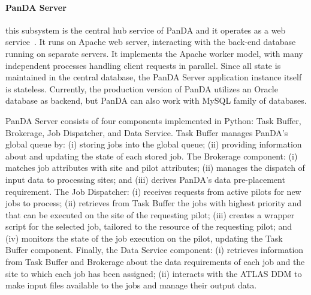 \paragraph{\textbf{PanDA Server}} this subsystem is the central hub service of
PanDA and it operates as a web service~\cite{maeno2011overview}. It runs on
Apache web server, interacting with the back-end database running on separate
servers. It implements the Apache worker model, with many independent processes
handling client requests in parallel. Since all state is maintained in the
central database, the PanDA Server application instance itself is stateless.
Currently, the production version of PanDA utilizes an Oracle database as
backend, but PanDA can also work with MySQL family of databases.


PanDA Server consists of four components implemented in Python:
Task Buffer, Brokerage, Job Dispatcher, and Data Service. Task Buffer manages
PanDA's global queue by: (i) storing jobs into the global queue; (ii) providing
information about and updating the state of each stored job. The Brokerage
component: (i) matches job attributes with site and pilot attributes; (ii)
manages the dispatch of input data to processing sites; and (iii) derives
PanDA's data pre-placement requirement. The Job Dispatcher: (i) receives
requests from active pilots for new jobs to process; (ii) retrieves from Task
Buffer the jobs with highest priority and that can be executed on the site of
the requesting pilot; (iii) creates a wrapper script for the selected job,
tailored to the resource of the requesting pilot; and (iv) monitors the state of
the job execution on the pilot, updating the Task Buffer component. Finally, the
Data Service component: (i) retrieves information from Task Buffer and Brokerage
about the data requirements of each job and the site to which each job has been
assigned; (ii) interacts with the ATLAS DDM to make input files available to the
jobs and manage their output data.


